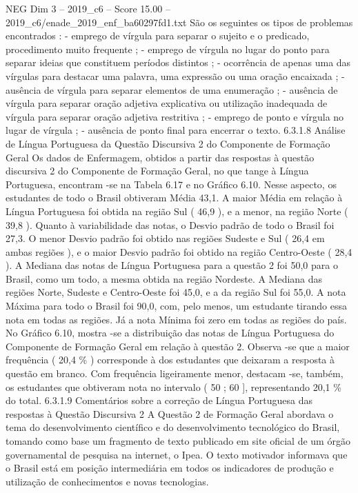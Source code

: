 \begin{textsample}{NEG Dim 3 – 2019\_c6 – Score 15.00 – 2019\_c6/enade\_2019\_enf\_ba60297fd1.txt}
São os seguintes os tipos de problemas encontrados : - emprego de vírgula para separar o sujeito e o predicado, procedimento muito frequente ; - emprego de vírgula no lugar do ponto para separar ideias que constituem períodos distintos ; - ocorrência de apenas uma das vírgulas para destacar uma palavra, uma expressão ou uma oração encaixada ; - ausência de vírgula para separar elementos de uma enumeração ; - ausência de vírgula para separar oração adjetiva explicativa ou utilização inadequada de vírgula para separar oração adjetiva restritiva ; - emprego de ponto e vírgula no lugar de vírgula ; - ausência de ponto final para encerrar o texto. 6.3.1.8 Análise de Língua Portuguesa da Questão Discursiva 2 do Componente de Formação Geral Os dados de Enfermagem, obtidos a partir das respostas à questão discursiva 2 do Componente de Formação Geral, no que tange à Língua Portuguesa, encontram -se na Tabela 6.17 e no Gráfico 6.10.
Nesse aspecto, os estudantes de todo o Brasil obtiveram Média 43,1.
A maior Média em relação à Língua Portuguesa foi obtida na região Sul ( 46,9 ), e a menor, na região Norte ( 39,8 ).
Quanto à variabilidade das notas, o Desvio padrão de todo o Brasil foi 27,3.
O menor Desvio padrão foi obtido nas regiões Sudeste e Sul ( 26,4 em ambas regiões ), e o maior Desvio padrão foi obtido na região Centro-Oeste ( 28,4 ).
A Mediana das notas de Língua Portuguesa para a questão 2 foi 50,0 para o Brasil, como um todo, a mesma obtida na região Nordeste.
A Mediana das regiões Norte, Sudeste e Centro-Oeste foi 45,0, e a da região Sul foi 55,0.
A nota Máxima para todo o Brasil foi 90,0, com, pelo menos, um estudante tirando essa nota em todas as regiões.
Já a nota Mínima foi zero em todas as regiões do país.
No Gráfico 6.10, mostra -se a distribuição das notas de Língua Portuguesa do Componente de Formação Geral em relação à questão 2.
Observa -se que a maior frequência ( 20,4 \% ) corresponde à dos estudantes que deixaram a resposta à questão em branco.
Com frequência ligeiramente menor, destacam -se, também, os estudantes que obtiveram nota no intervalo ( 50 ; 60 ], representando 20,1 \% do total. 6.3.1.9 Comentários sobre a correção de Língua Portuguesa das respostas à Questão Discursiva 2 A Questão 2 de Formação Geral abordava o tema do desenvolvimento científico e do desenvolvimento tecnológico do Brasil, tomando como base um fragmento de texto publicado em site oficial de um órgão governamental de pesquisa na internet, o Ipea.
O texto motivador informava que o Brasil está em posição intermediária em todos os indicadores de produção e utilização de conhecimentos e novas tecnologias.

\end{textsample}
